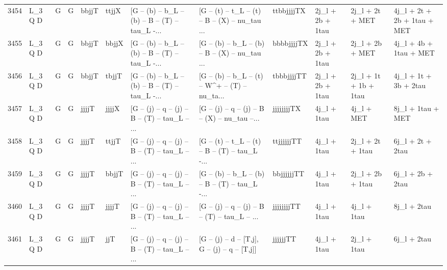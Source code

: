 \begin{tabular}{llllllllllll}
3454 &      L\_3 Q D &     G &     G &       bbjjT &       ttjjX &  [G -- (b) -- b\_L -- (b) -- B -- (T) -- tau\_L -... &  [G -- (t) -- t\_L -- (t) -- B -- (X) -- nu\_tau ... &  ttbbjjjjTX &         2j\_l + 2b + 1tau &          2j\_l + 2t + MET &        4j\_l + 2t + 2b + 1tau + MET \\
3455 &      L\_3 Q D &     G &     G &       bbjjT &       bbjjX &  [G -- (b) -- b\_L -- (b) -- B -- (T) -- tau\_L -... &  [G -- (b) -- b\_L -- (b) -- B -- (X) -- nu\_tau ... &  bbbbjjjjTX &         2j\_l + 2b + 1tau &          2j\_l + 2b + MET &             4j\_l + 4b + 1tau + MET \\
3456 &      L\_3 Q D &     G &     G &       bbjjT &       tbjjT &  [G -- (b) -- b\_L -- (b) -- B -- (T) -- tau\_L -... &  [G -- (b) -- b\_L -- (t) -- W\textasciicircum + -- (T) -- nu\_ta... &  tbbbjjjjTT &         2j\_l + 2b + 1tau &    2j\_l + 1t + 1b + 1tau &              4j\_l + 1t + 3b + 2tau \\
3457 &      L\_3 Q D &     G &     G &       jjjjT &       jjjjX &  [G -- (j) -- q -- (j) -- B -- (T) -- tau\_L -- ... &  [G -- (j) -- q -- (j) -- B -- (X) -- nu\_tau --... &  jjjjjjjjTX &              4j\_l + 1tau &               4j\_l + MET &                  8j\_l + 1tau + MET \\
3458 &      L\_3 Q D &     G &     G &       jjjjT &       ttjjT &  [G -- (j) -- q -- (j) -- B -- (T) -- tau\_L -- ... &  [G -- (t) -- t\_L -- (t) -- B -- (T) -- tau\_L -... &  ttjjjjjjTT &              4j\_l + 1tau &         2j\_l + 2t + 1tau &                   6j\_l + 2t + 2tau \\
3459 &      L\_3 Q D &     G &     G &       jjjjT &       bbjjT &  [G -- (j) -- q -- (j) -- B -- (T) -- tau\_L -- ... &  [G -- (b) -- b\_L -- (b) -- B -- (T) -- tau\_L -... &  bbjjjjjjTT &              4j\_l + 1tau &         2j\_l + 2b + 1tau &                   6j\_l + 2b + 2tau \\
3460 &      L\_3 Q D &     G &     G &       jjjjT &       jjjjT &  [G -- (j) -- q -- (j) -- B -- (T) -- tau\_L -- ... &  [G -- (j) -- q -- (j) -- B -- (T) -- tau\_L -- ... &  jjjjjjjjTT &              4j\_l + 1tau &              4j\_l + 1tau &                        8j\_l + 2tau \\
3461 &      L\_3 Q D &     G &     G &       jjjjT &         jjT &  [G -- (j) -- q -- (j) -- B -- (T) -- tau\_L -- ... &   [G -- (j) -- d -- [T,j], G -- (j) -- q -- [T,j]] &    jjjjjjTT &              4j\_l + 1tau &              2j\_l + 1tau &                        6j\_l + 2tau \\

\end{tabular}

